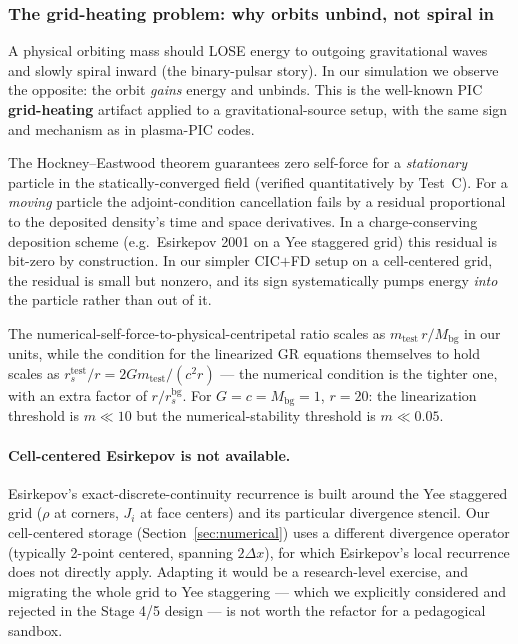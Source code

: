 \documentclass[11pt,a4paper]{article}
\begin{document}
\subsubsection*{The grid-heating problem: why orbits unbind, not spiral in}
\label{sec:stage10_heating}

A physical orbiting mass should LOSE energy to outgoing gravitational
waves and slowly spiral inward (the binary-pulsar story).  In our
simulation we observe the opposite: the orbit \emph{gains} energy and
unbinds.  This is the well-known PIC \textbf{grid-heating} artifact
applied to a gravitational-source setup, with the same sign and
mechanism as in plasma-PIC codes.

The Hockney--Eastwood theorem guarantees zero self-force for a
\emph{stationary} particle in the statically-converged field (verified
quantitatively by Test~C).  For a \emph{moving} particle the
adjoint-condition cancellation fails by a residual proportional to the
deposited density's time and space derivatives.  In a
charge-conserving deposition scheme (e.g.\ Esirkepov 2001 on a Yee
staggered grid) this residual is bit-zero by construction.  In our
simpler CIC$+$FD setup on a cell-centered grid, the residual is small
but nonzero, and its sign systematically pumps energy \emph{into} the
particle rather than out of it.

The numerical-self-force-to-physical-centripetal ratio scales as
$m_{\mathrm{test}}\,r/M_{\mathrm{bg}}$ in our units, while the
condition for the linearized GR equations themselves to hold scales as
$r_s^{\mathrm{test}}/r = 2 G m_{\mathrm{test}}/(c^2 r)$ — the numerical
condition is the tighter one, with an extra factor of $r/r_s^{\mathrm{bg}}$.
For $G = c = M_{\mathrm{bg}} = 1$, $r = 20$: the linearization
threshold is $m \ll 10$ but the numerical-stability threshold is
$m \ll 0.05$.

\paragraph{Cell-centered Esirkepov is not available.}
Esirkepov's exact-discrete-continuity recurrence is built around the Yee
staggered grid ($\rho$ at corners, $J_i$ at face centers) and its
particular divergence stencil.  Our cell-centered storage (Section~\ref{sec:numerical})
uses a different divergence operator (typically 2-point centered, spanning
$2\Delta x$), for which Esirkepov's local recurrence does not directly apply.
Adapting it would be a research-level exercise, and migrating the whole
grid to Yee staggering — which we explicitly considered and rejected in
the Stage 4/5 design — is not worth the refactor for a pedagogical sandbox.
\end{document}
